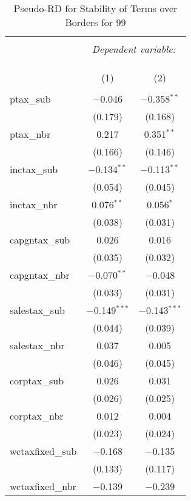 
\begin{table}[!htbp] \centering 
  \caption{Pseudo-RD for Stability of Terms over Borders for  99} 
  \label{} 
\begin{tabular}{@{\extracolsep{5pt}}lcc} 
\\[-1.8ex]\hline 
\hline \\[-1.8ex] 
 & \multicolumn{2}{c}{\textit{Dependent variable:}} \\ 
\cline{2-3} 
\\[-1.8ex] & \multicolumn{2}{c}{ } \\ 
\\[-1.8ex] & (1) & (2)\\ 
\hline \\[-1.8ex] 
 ptax\_sub & $-$0.046 & $-$0.358$^{**}$ \\ 
  & (0.179) & (0.168) \\ 
  ptax\_nbr & 0.217 & 0.351$^{**}$ \\ 
  & (0.166) & (0.146) \\ 
  inctax\_sub & $-$0.134$^{**}$ & $-$0.113$^{**}$ \\ 
  & (0.054) & (0.045) \\ 
  inctax\_nbr & 0.076$^{**}$ & 0.056$^{*}$ \\ 
  & (0.038) & (0.031) \\ 
  capgntax\_sub & 0.026 & 0.016 \\ 
  & (0.035) & (0.032) \\ 
  capgntax\_nbr & $-$0.070$^{**}$ & $-$0.048 \\ 
  & (0.033) & (0.031) \\ 
  salestax\_sub & $-$0.149$^{***}$ & $-$0.143$^{***}$ \\ 
  & (0.044) & (0.039) \\ 
  salestax\_nbr & 0.037 & 0.005 \\ 
  & (0.046) & (0.045) \\ 
  corptax\_sub & 0.026 & 0.031 \\ 
  & (0.026) & (0.025) \\ 
  corptax\_nbr & 0.012 & 0.004 \\ 
  & (0.023) & (0.024) \\ 
  wctaxfixed\_sub & $-$0.168 & $-$0.135 \\ 
  & (0.133) & (0.117) \\ 
  wctaxfixed\_nbr & $-$0.139 & $-$0.239 \\ 

\end{tabular}
\end{table}
